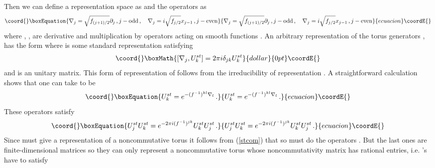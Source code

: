 \documentclass[a4paper,a4paper]{article}
\begin{document}
Then we can define a representation space as \coordHE{} 
and the operators \coordHE{}  as 
\begin{equation}\coord{}\boxEquation{ \label{nabla} 
\nabla_{j} = \sqrt{f_{(j+ 1)/2}}\partial_{j} \, , j - \mbox{odd} \, , \quad \nabla_{j} = i\sqrt{f_{j/2}}x_{j-1}\, , j - \mbox{even} 
}{ \nabla_{j} = \sqrt{f_{(j+ 1)/2}}\partial_{j} \, , j - \mbox{odd} \, , \quad \nabla_{j} = i\sqrt{f_{j/2}}x_{j-1}\, , j - \mbox{even} 
}{ecuacion}\coordE{}\end{equation} 
where \coordHE{}, \coordHE{}, \coordHE{}  are derivative and multiplication by \coordHE{} operators acting 
on smooth functions \coordHE{}.
An arbitrary representation of the torus generators \coordHE{}, \coordHE{} has the form 
\coordHE{}  
where \coordHE{} is some standard representation satisfying 
$$\coord{}\boxMath{
[\nabla_{j}, U_{k}^{st}]= 2\pi i \delta_{jk} U_{k}^{st}
}{dollar}{0pt}\coordE{}$$ 
and \coordHE{} is an \coordHE{}  unitary matrix. This form of representation of \coordHE{} follows from the irreducibility 
of representation \coordHE{}. 
A straightforward calculation shows that one can take \coordHE{} to be   
\begin{equation}\coord{}\boxEquation{\label{Ust}
U_{k}^{st} = e^{-(f^{-1})^{kl}\nabla_{l}} \, .
}{U_{k}^{st} = e^{-(f^{-1})^{kl}\nabla_{l}} \, .
}{ecuacion}\coordE{}\end{equation}
These operators satisfy
\begin{equation}\coord{}\boxEquation{ \label{stcom}
U_{j}^{st}U_{k}^{st} = e^{-2\pi i (f^{-1})^{jk}} U_{k}^{st}U_{j}^{st} \, .
}{ U_{j}^{st}U_{k}^{st} = e^{-2\pi i (f^{-1})^{jk}} U_{k}^{st}U_{j}^{st} \, .
}{ecuacion}\coordE{}\end{equation}
Since \coordHE{} must give a representation of a noncommutative torus it follows from (\ref{stcom}) that 
so must do  the operators \coordHE{}. But the last ones are finite-dimensional matrices so they can only represent a 
noncommutative torus whose noncommutativity matrix has rational entries, i.e. \coordHE{}'s have to satisfy  
\end{document}
